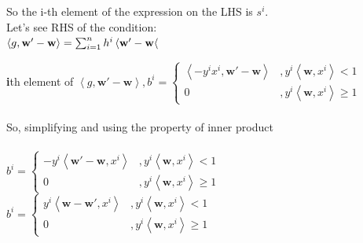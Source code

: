 \documentclass[a4paper,11pt]{article}
\begin{document}
\begin{mlsolution}
So the i-th element of the expression on the LHS is \begin{math}
s^{i}.\end{math}\\

Let's see RHS of the condition:\\

\begin{math}\left \langle g, \textbf{w}{}' - \textbf{w} \right \rangle = \sum_{i=1}^{n} h^{i}\left \langle \textbf{w}{}' - \textbf{w} \right \langle \\
\end{math}

\textbf{i}th element of \begin{math}
\left \langle g, \textbf{w}{}' - \textbf{w} \right \rangle, b^{i} = \left\{\begin{matrix}
\left \langle -y^{i}x^{i}, \textbf{w}{}' - \textbf{w} \right \rangle & ,y^{i}\left \langle \textbf{w}, x^{i} \right \rangle < 1\\ 
0 & ,y^{i}\left \langle \textbf{w}, x^{i} \right \rangle \geq 1
\end{matrix}\right.
\end{math}\\\\

So, simplifying and using the property of inner product\\\\

\begin{math}
b^{i} = \left\{\begin{matrix}
-y^{i} \left \langle \textbf{w}{}' - \textbf{w}, x^{i}\right \rangle & ,y^{i}\left \langle \textbf{w}, x^{i} \right \rangle < 1\\ 
0 & ,y^{i}\left \langle \textbf{w}, x^{i} \right \rangle \geq 1
\end{matrix}\right.
\end{math}\\

\begin{math}
b^{i} = \left\{\begin{matrix}
y^{i} \left \langle \textbf{w} - \textbf{w}{}', x^{i} \right \rangle & ,y^{i}\left \langle \textbf{w}, x^{i} \right \rangle < 1\\ 
0 & ,y^{i}\left \langle \textbf{w}, x^{i} \right \rangle \geq 1
\end{matrix}\right.
\end{math}\\


\end{mlsolution}
\end{document}
